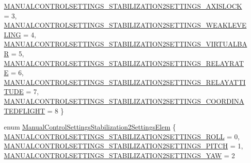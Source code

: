 \begin{DoxyCompactItemize}
\hyperlink{group___manual_control_settings_gga2ff26eb42e2fe951905ac17ef6514faba29499ce90b77665fea888ab5c09b94af}{\-M\-A\-N\-U\-A\-L\-C\-O\-N\-T\-R\-O\-L\-S\-E\-T\-T\-I\-N\-G\-S\-\_\-\-S\-T\-A\-B\-I\-L\-I\-Z\-A\-T\-I\-O\-N2\-S\-E\-T\-T\-I\-N\-G\-S\-\_\-\-A\-X\-I\-S\-L\-O\-C\-K} = 3, 
\*
\hyperlink{group___manual_control_settings_gga2ff26eb42e2fe951905ac17ef6514faba60bce08be5a96212ab7100d1615a3ac6}{\-M\-A\-N\-U\-A\-L\-C\-O\-N\-T\-R\-O\-L\-S\-E\-T\-T\-I\-N\-G\-S\-\_\-\-S\-T\-A\-B\-I\-L\-I\-Z\-A\-T\-I\-O\-N2\-S\-E\-T\-T\-I\-N\-G\-S\-\_\-\-W\-E\-A\-K\-L\-E\-V\-E\-L\-I\-N\-G} = 4, 
\hyperlink{group___manual_control_settings_gga2ff26eb42e2fe951905ac17ef6514faba683d0fc28af5ce59e0543b68ca08d417}{\-M\-A\-N\-U\-A\-L\-C\-O\-N\-T\-R\-O\-L\-S\-E\-T\-T\-I\-N\-G\-S\-\_\-\-S\-T\-A\-B\-I\-L\-I\-Z\-A\-T\-I\-O\-N2\-S\-E\-T\-T\-I\-N\-G\-S\-\_\-\-V\-I\-R\-T\-U\-A\-L\-B\-A\-R} = 5, 
\hyperlink{group___manual_control_settings_gga2ff26eb42e2fe951905ac17ef6514faba44d12e4404ad626abb4f47cca565e5ff}{\-M\-A\-N\-U\-A\-L\-C\-O\-N\-T\-R\-O\-L\-S\-E\-T\-T\-I\-N\-G\-S\-\_\-\-S\-T\-A\-B\-I\-L\-I\-Z\-A\-T\-I\-O\-N2\-S\-E\-T\-T\-I\-N\-G\-S\-\_\-\-R\-E\-L\-A\-Y\-R\-A\-T\-E} = 6, 
\hyperlink{group___manual_control_settings_gga2ff26eb42e2fe951905ac17ef6514faba635e480ddb6ed951cea161a134ccb3c0}{\-M\-A\-N\-U\-A\-L\-C\-O\-N\-T\-R\-O\-L\-S\-E\-T\-T\-I\-N\-G\-S\-\_\-\-S\-T\-A\-B\-I\-L\-I\-Z\-A\-T\-I\-O\-N2\-S\-E\-T\-T\-I\-N\-G\-S\-\_\-\-R\-E\-L\-A\-Y\-A\-T\-T\-I\-T\-U\-D\-E} = 7, 
\*
\hyperlink{group___manual_control_settings_gga2ff26eb42e2fe951905ac17ef6514fabaf49f5dfe60a169ea46748667b4d8801b}{\-M\-A\-N\-U\-A\-L\-C\-O\-N\-T\-R\-O\-L\-S\-E\-T\-T\-I\-N\-G\-S\-\_\-\-S\-T\-A\-B\-I\-L\-I\-Z\-A\-T\-I\-O\-N2\-S\-E\-T\-T\-I\-N\-G\-S\-\_\-\-C\-O\-O\-R\-D\-I\-N\-A\-T\-E\-D\-F\-L\-I\-G\-H\-T} = 8
 \}
\item 
enum \hyperlink{group___manual_control_settings_ga0153b46a54e980030bfb4d65c1bee4a4}{\-Manual\-Control\-Settings\-Stabilization2\-Settings\-Elem} \{ \hyperlink{group___manual_control_settings_gga0153b46a54e980030bfb4d65c1bee4a4a3cef59aec8ccb7306214d6c51e792e37}{\-M\-A\-N\-U\-A\-L\-C\-O\-N\-T\-R\-O\-L\-S\-E\-T\-T\-I\-N\-G\-S\-\_\-\-S\-T\-A\-B\-I\-L\-I\-Z\-A\-T\-I\-O\-N2\-S\-E\-T\-T\-I\-N\-G\-S\-\_\-\-R\-O\-L\-L} = 0, 
\hyperlink{group___manual_control_settings_gga0153b46a54e980030bfb4d65c1bee4a4a34ea60700227e5e2c0f0cbb7a344d7e0}{\-M\-A\-N\-U\-A\-L\-C\-O\-N\-T\-R\-O\-L\-S\-E\-T\-T\-I\-N\-G\-S\-\_\-\-S\-T\-A\-B\-I\-L\-I\-Z\-A\-T\-I\-O\-N2\-S\-E\-T\-T\-I\-N\-G\-S\-\_\-\-P\-I\-T\-C\-H} = 1, 
\hyperlink{group___manual_control_settings_gga0153b46a54e980030bfb4d65c1bee4a4a104c73d54ad6aa3bf0094d39745b0f46}{\-M\-A\-N\-U\-A\-L\-C\-O\-N\-T\-R\-O\-L\-S\-E\-T\-T\-I\-N\-G\-S\-\_\-\-S\-T\-A\-B\-I\-L\-I\-Z\-A\-T\-I\-O\-N2\-S\-E\-T\-T\-I\-N\-G\-S\-\_\-\-Y\-A\-W} = 2

\end{DoxyCompactItemize}
